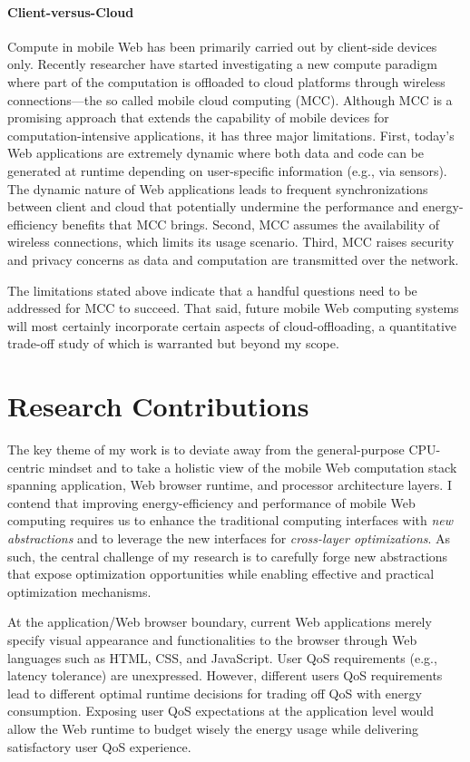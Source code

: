 \paragraph{Client-versus-Cloud} Compute in mobile Web has been primarily carried out by client-side devices only. Recently researcher have started investigating a new compute paradigm where part of the computation is offloaded to cloud platforms through wireless connections---the so called mobile cloud computing (MCC). Although MCC is a promising approach that extends the capability of mobile devices for computation-intensive applications, it has three major limitations. First, today's Web applications are extremely dynamic where both data and code can be generated at runtime depending on user-specific information (e.g., via sensors). The dynamic nature of Web applications leads to frequent synchronizations between client and cloud that potentially undermine the performance and energy-efficiency benefits that MCC brings. Second, MCC assumes the availability of wireless connections, which limits its usage scenario. Third, MCC raises security and privacy concerns as data and computation are transmitted over the network.

The limitations stated above indicate that a handful questions need to be addressed for MCC to succeed. That said, future mobile Web computing systems will most certainly incorporate certain aspects of cloud-offloading, a quantitative trade-off study of which is warranted but beyond my scope.

\section{Research Contributions}
\label{sec:intro:work}

The key theme of my work is to deviate away from the general-purpose CPU-centric mindset and to take a holistic view of the mobile Web computation stack spanning application, Web browser runtime, and processor architecture layers. I contend that improving energy-efficiency and performance of mobile Web computing requires us to enhance the traditional computing interfaces with \textit{new abstractions} and to leverage the new interfaces for \textit{cross-layer optimizations}. As such, the central challenge of my research is to carefully forge new abstractions that expose optimization opportunities while enabling effective and practical optimization mechanisms.

At the application/Web browser boundary, current Web applications merely specify visual appearance and functionalities to the browser through Web languages such as HTML, CSS, and JavaScript. User QoS requirements (e.g., latency tolerance) are unexpressed. However, different users QoS requirements lead to different optimal runtime decisions for trading off QoS with energy consumption. Exposing user QoS expectations at the application level would allow the Web runtime to budget wisely the energy usage while delivering satisfactory user QoS experience.

